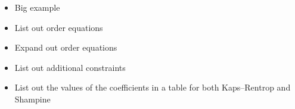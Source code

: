\documentclass{ansconf}
\numberwithin{equation}{section}
\begin{document}
\begin{itemize}
    \item Big example
    \item List out order equations
    \item Expand out order equations
    \item List out additional constraints
    \item List out the values of the coefficients in a table for both Kaps--Rentrop and Shampine
\end{itemize}

 \label{sec:var_ts}

 \label{sec:impl}

\end{document}
